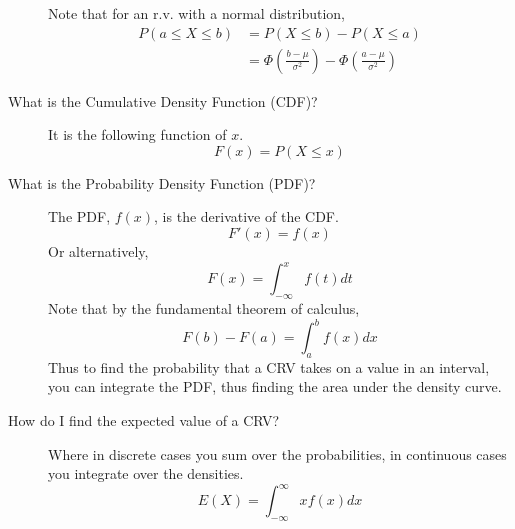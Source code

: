 \documentclass[10pt,landscape]{article}
\begin{document}
\begin{multicols}{3}
\begin{description}
Note that for an r.v. with a normal distribution,
\begin{align*}
P(a\leq X\leq b)&=P(X\leq b)-P(X\leq a)\\
&=\Phi \left(\frac{b-\mu }{\sigma ^2} \right) - \Phi \left( \frac{a-\mu }{\sigma ^2} \right)
\end{align*}

\item[What is the Cumulative Density Function (CDF)?] It is the following function of $x$.
        \[F(x) = P(X \leq x)\]

\item[What is the Probability Density Function (PDF)?] The PDF, $f(x)$, is the derivative of the CDF. 
\[ F'(x) = f(x) \]
Or alternatively,
\[ F(x) = \int_{-\infty}^x f(t)dt \]
Note that by the fundamental theorem of calculus,
\[ F(b) - F(a) = \int^b_a f(x)dx \]
Thus to find the probability that a CRV takes on a value in an interval, you can integrate the PDF, thus finding the area under the density curve.

\item[How do I find the expected value of a CRV?] Where in discrete cases you sum over the probabilities, in continuous cases you integrate over the densities.
\[E(X) = \int^\infty_{-\infty}xf(x)dx \]
\end{description}


\label{lotus}

\end{multicols}
\end{document}
